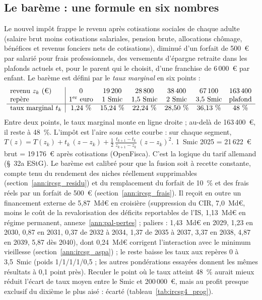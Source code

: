 
\subsection{Le barème : une formule en six nombres}

Le nouvel impôt frappe le revenu après cotisations sociales de chaque adulte (salaire brut moins cotisations salariales, pension brute, allocations chômage, bénéfices et revenus fonciers nets de cotisations), diminué d'un forfait de 500~€ par salarié pour frais professionnels, des versements d'épargne retraite dans les plafonds actuels et, pour le parent qui le choisit, d'une franchise de 6\,000~€ par enfant. Le barème est défini par le \emph{taux marginal} en six points :
\[
\begin{array}{l|cccccc}
\text{revenu } z_k \text{ (€)} & 0 & 19\,200 & 28\,800 & 38\,400 & 67\,100 & 163\,400\\
\text{repère} & \text{1\textsuperscript{er} euro} & 1~\text{Smic} & 1{,}5~\text{Smic} & 2~\text{Smic} & 3{,}5~\text{Smic} & \text{plafond}\\ \hline
\text{taux marginal } t_k & 1{,}24~\% & 15{,}24~\% & 22{,}24~\% & 28{,}50~\% & 36{,}13~\% & 48~\%
\end{array}
\]
Entre deux points, le taux marginal monte en ligne droite ; au-delà de 163\,400~€, il reste à 48~\%. L'impôt est l'aire sous cette courbe : sur chaque segment, $T(z)=T(z_k)+t_k\,(z-z_k)+\tfrac12\,\frac{t_{k+1}-t_k}{z_{k+1}-z_k}\,(z-z_k)^2$. 1~Smic 2025 = 21\,622~€ brut = 19\,176~€ après cotisations (OpenFisca). C'est la logique du tarif allemand (\S~32a EStG). Le barème est calibré pour que la fusion soit à recette constante, compte tenu du rendement des niches réellement supprimables (section~\ref{ann:ircsg_residu}) et du remplacement du forfait de 10~\% et des frais réels par un forfait de 500~€ (section~\ref{ann:ircsg_frais}). Il reçoit en outre un financement externe de 5,87~Md€ en croisière (suppression du CIR, 7,0~Md€, moins le coût de la revalorisation des déficits reportables de l'IS, 1,13~Md€ en régime permanent, annexe~\ref{ann:pal-pertes} ; paliers : 1,43~Md€ en 2029, 1,23 en 2030, 0,87 en 2031, 0,37 de 2032 à 2034, 1,37 de 2035 à 2037, 3,37 en 2038, 4,87 en 2039, 5,87 dès 2040), dont 0,24~Md€ corrigent l'interaction avec le minimum vieillesse (section~\ref{ann:ircsg_aspa}) ; le reste baisse les taux aux repères 0 à 3,5~Smic (poids 1/1/1/1/0,5 ; les autres pondérations essayées donnent les mêmes résultats à 0,1 point près). Reculer le point où le taux atteint 48~\% aurait mieux réduit l'écart de taux moyen entre le Smic et 200\,000~€, mais au profit presque exclusif du dixième le plus aisé : écarté (tableau~\ref{tab:ircsg4_prog}).

